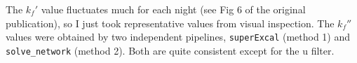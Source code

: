The $ k_f' $ value fluctuates much for each night (see Fig 6 of the original publication), so I just took representative values from visual inspection. The $ k_f'' $ values were obtained by two independent pipelines, \texttt{superExcal} (method 1) and \texttt{solve\_network} (method 2). Both are quite consistent except for the u filter.




 


